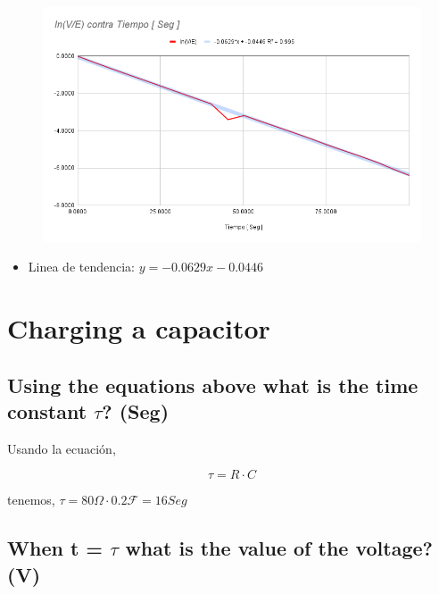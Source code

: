 \documentclass[twocolumn, 12pt]{article}
\begin{document}
\begin{figure}[H]
    \centering
    \includegraphics[width=\linewidth]{./Images/ln(V_E) contra Tiempo [ Seg ] Descarga.png}
\end{figure}

\begin{itemize}[label=$\triangleright$]
    \item Linea de tendencia:\hfill \break{} $y= -0.0629x -0.0446$
\end{itemize}

\section{Charging a capacitor}

\subsection{Using the equations above what is the time constant $\tau$? (Seg)}

Usando la ecuación,

{\large
        \begin{equation}
            \tau = R \cdot C
            \label{eq:Tau}
        \end{equation}
    }

tenemos, $\tau = 80 \Omega \cdot 0.2 \mathcal{F} = 16 Seg$

\subsection{When t = $\tau$ what is the value of the voltage? (V)}
\end{document}
